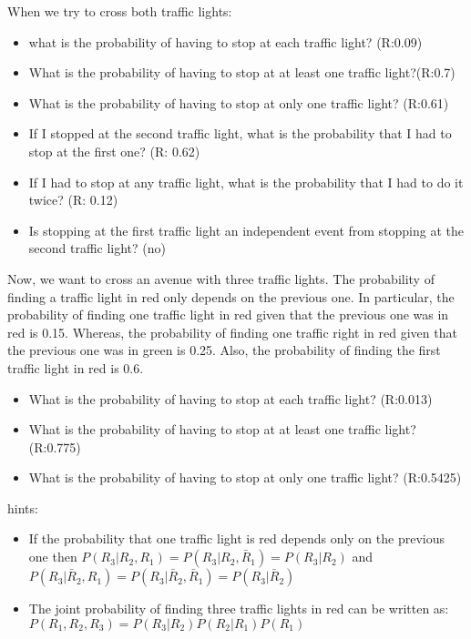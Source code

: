 \documentclass[
]{book}
\providecommand{\tightlist}{%
  \setlength{\itemsep}{0pt}\setlength{\parskip}{0pt}}
\begin{document}
When we try to cross both traffic lights:

\begin{itemize}
\tightlist
\item
  what is the probability of having to stop at each traffic light? (R:0.09)
\item
  What is the probability of having to stop at at least one traffic light?(R:0.7)
\item
  What is the probability of having to stop at only one traffic light? (R:0.61)
\item
  If I stopped at the second traffic light, what is the probability that I had to stop at the first one? (R: 0.62)
\item
  If I had to stop at any traffic light, what is the probability that I had to do it twice? (R: 0.12)
\item
  Is stopping at the first traffic light an independent event from stopping at the second traffic light? (no)
\end{itemize}

Now, we want to cross an avenue with three traffic lights. The probability of finding a traffic light in red only depends on the previous one. In particular, the probability of finding one traffic light in red given that the previous one was in red is 0.15. Whereas, the probability of finding one traffic right in red given that the previous one was in green is 0.25. Also, the probability of finding the first traffic light in red is 0.6.

\begin{itemize}
\tightlist
\item
  What is the probability of having to stop at each traffic light? (R:0.013)
\item
  What is the probability of having to stop at at least one traffic light? (R:0.775)
\item
  What is the probability of having to stop at only one traffic light? (R:0.5425)
\end{itemize}

hints:

\begin{itemize}
\item
  If the probability that one traffic light is red depends only on the previous one then
  \(P(R_3|R_2,R_1)=P(R_3|R_2,\bar{R}_1)=P(R_3|R_2)\) and \(P(R_3|\bar{R}_2,R_1)=P(R_3|\bar{R}_2,\bar{R}_1)=P(R_3|\bar{R}_2)\)
\item
  The joint probability of finding three traffic lights in red can be written as:
  \(P(R_1,R_2,R_3)=P(R_3|R_2)P(R_2|R_1)P(R_1)\)
\end{itemize}
\end{document}
